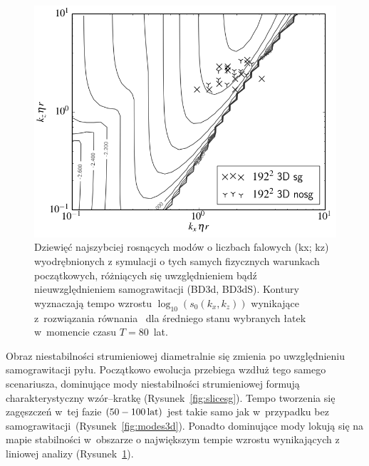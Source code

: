 \begin{figure}[h]
   \centering
   \includegraphics[width=0.5\linewidth]{figures/3d_map_x3_50.png}
   \caption{
      Dziewięć najszybciej rosnących modów o liczbach falowych (kx; kz)
      wyodrębnionych z symulacji o tych samych fizycznych warunkach
      początkowych, różniących się uwzględnieniem bądź nieuwzględnieniem
      samograwitacji (BD3d, BD3dS).  Kontury wyznaczają tempo wzrostu
      $\log_{10}(s_0(k_x, k_z))$ wynikające z~rozwiązania równania~
       dla średniego stanu wybranych łatek w~momencie
      czasu $T = 80$~lat.}
   \label{fig:map3d}
\end{figure}
Obraz niestabilności strumieniowej diametralnie się zmienia po
uwzględnieniu samograwitacji pyłu. Początkowo ewolucja przebiega wzdłuż tego
samego scenariusza, dominujące mody niestabilności strumieniowej formują
charakterystyczny wzór--kratkę (Rysunek~\ref{fig:slicesg}). Tempo tworzenia się
zagęszczeń w~tej fazie $(50 - 100\hbox{$\thinspace\textrm{lat}$})$ jest takie samo jak w~przypadku bez
samograwitacji~(Rysunek~\ref{fig:modes3d}). Ponadto dominujące mody lokują się
na mapie stabilności w~obszarze o największym tempie wzrostu wynikających z
liniowej analizy (Rysunek~\ref{fig:map3d}).
%
